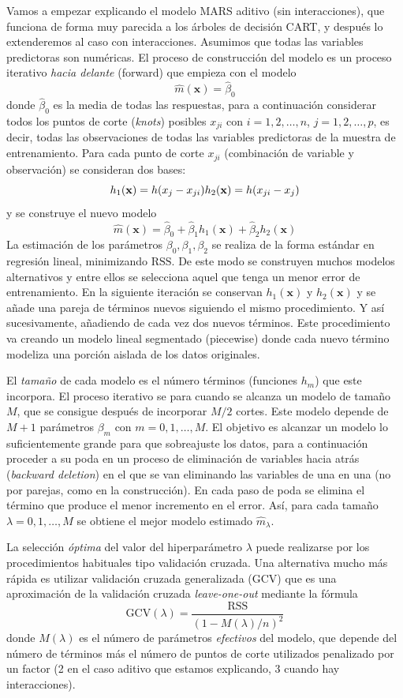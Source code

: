 \documentclass[
  spanish,
]{book}
\theoremstyle{break}
\theoremstyle{definition}
\theoremstyle{definition}
\theoremstyle{definition}
\theoremstyle{definition}
\theoremstyle{remark}
\begin{document}
Vamos a empezar explicando el modelo MARS aditivo (sin interacciones), que funciona de forma muy parecida a los árboles de decisión CART, y después lo extenderemos al caso con interacciones.
Asumimos que todas las variables predictoras son numéricas. El proceso de construcción del modelo es un proceso iterativo \emph{hacia delante} (forward) que empieza con el modelo
\[\hat m(\mathbf{x}) = \hat \beta_0 \]
donde \(\hat \beta_0\) es la media de todas las respuestas, para a continuación considerar todos los puntos de corte (\emph{knots}) posibles \(x_{ji}\) con \(i = 1, 2, \ldots, n\), \(j = 1, 2, \ldots, p\), es decir, todas las observaciones de todas las variables predictoras de la muestra de entrenamiento.
Para cada punto de corte \(x_{ji}\) (combinación de variable y observación) se consideran dos bases:
\[h_1(\mathbf{x}) = h(x_j - x_{ji}) \\
h_2(\mathbf{x}) = h(x_{ji} - x_j)\]
y se construye el nuevo modelo
\[\hat m(\mathbf{x}) = \hat \beta_0 + \hat \beta_1 h_1(\mathbf{x}) + \hat \beta_2 h_2(\mathbf{x})\]
La estimación de los parámetros \(\beta_0, \beta_1, \beta_2\) se realiza de la forma estándar en regresión lineal, minimizando \(\mbox{RSS}\). De este modo se construyen muchos modelos alternativos y entre ellos se selecciona aquel que tenga un menor error de entrenamiento. En la siguiente iteración se conservan \(h_1(\mathbf{x})\) y \(h_2(\mathbf{x})\) y se añade una pareja de términos nuevos siguiendo el mismo procedimiento. Y así sucesivamente, añadiendo de cada vez dos nuevos términos. Este procedimiento va creando un modelo lineal segmentado (piecewise) donde cada nuevo término modeliza una porción aislada de los datos originales.

El \emph{tamaño} de cada modelo es el número términos (funciones \(h_m\)) que este incorpora. El proceso iterativo se para cuando se alcanza un modelo de tamaño \(M\), que se consigue después de incorporar \(M/2\) cortes. Este modelo depende de \(M+1\) parámetros \(\beta_m\) con \(m=0,1,\ldots,M\). El objetivo es alcanzar un modelo lo suficientemente grande para que sobreajuste los datos, para a continuación proceder a su poda en un proceso de eliminación de variables hacia atrás (\emph{backward deletion}) en el que se van eliminando las variables de una en una (no por parejas, como en la construcción). En cada paso de poda se elimina el término que produce el menor incremento en el error. Así, para cada tamaño \(\lambda = 0,1,\ldots, M\) se obtiene el mejor modelo estimado \(\hat{m}_{\lambda}\).

La selección \emph{óptima} del valor del hiperparámetro \(\lambda\) puede realizarse por los procedimientos habituales tipo validación cruzada. Una alternativa mucho más rápida es utilizar validación cruzada generalizada (GCV) que es una aproximación de la validación cruzada \emph{leave-one-out} mediante la fórmula
\[\mbox{GCV} (\lambda) = \frac{\mbox{RSS}}{(1-M(\lambda)/n)^2}\]
donde \(M(\lambda)\) es el número de parámetros \emph{efectivos} del modelo, que depende del número de términos más el número de puntos de corte utilizados penalizado por un factor (2 en el caso aditivo que estamos explicando, 3 cuando hay interacciones).
\end{document}
